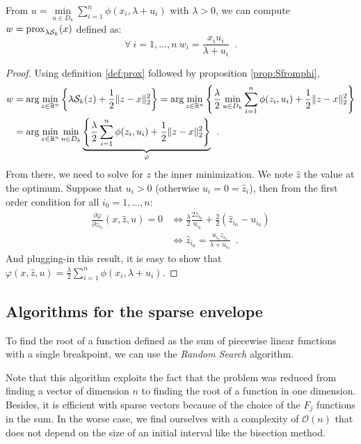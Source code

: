 \begin{proposition}
From $u=\min\limits_{u\in D_k}\sum_{i=1}^n \phi(x_i,\lambda + u_i)$ with $\lambda > 0$, we can compute $w=\operatorname{prox}_{\lambda\mathcal{S}_k}(x)$ defined as:
\begin{equation}\label{eq:proxui}
    \forall\ i=1,\dots,n\ w_i=\frac{x_iu_i}{\lambda + u_i}\enspace.
\end{equation}
\end{proposition}
\begin{proof}
Using definition \ref{def:prox} followed by proposition \ref{prop:Sfromphi}, \[\begin{aligned}
w&=\arg\min_{z\in\mathbb{R}^n}\left\{\lambda\mathcal{S}_k(z) + \frac{1}{2}\|z-x\|^2_2\right\} = \arg\min_{z\in\mathbb{R}^n}\left\{\frac{\lambda}{2}\min_{u\in D_k}\sum_{i=1}^n\phi(z_i, u_i) + \frac{1}{2}\|z-x\|^2_2\right\}\\
&=\arg\min_{z\in\mathbb{R}^n}\min_{u\in D_k}\underbrace{\left\{\frac{\lambda}{2}\sum_{i=1}^n\phi(z_i, u_i) + \frac{1}{2}\|z-x\|^2_2\right\}}_{\varphi}\enspace.
\end{aligned}\]
From there, we need to solve for $z$ the inner minimization. We note $\hat z$ the value at the optimum. Suppose that $u_i>0$ (otherwise $u_i=0=\hat z_i$), then from the first order condition for all $i_0=1,\dots,n$:
\[\begin{aligned}
\frac{\partial\varphi}{\partial z_{i_0}}(x, \hat z, u)= 0 &\Longleftrightarrow \frac{\lambda}{2}\frac{2\hat z_{i_0}}{u_{i_0}} + \frac{2}{2}(\hat z_{i_0} - u_{i_0})\\
& \Longleftrightarrow \hat z_{i_0} = \frac{u_{i_0}z_{i_0}}{\lambda + u_{i_0}}\enspace.
\end{aligned}\]
And plugging-in this result, it is easy to show that $\varphi(x,\hat z, u) = \frac{\lambda}{2}\sum_{i=1}^n \phi(x_i, \lambda + u_i)$.
\end{proof}

\subsection[Algorithm]{Algorithms for the sparse envelope}
To find the root of a function defined as the sum of piecewise linear functions with a single breakpoint, we can use the \textit{Random Search} algorithm.


\begin{remark}
Note that this algorithm exploits the fact that the problem was reduced from finding a vector of dimension $n$ to finding the root of a function in one dimension. Besides, it is efficient with sparse vectors because of the choice of the $F_j$ functions in the sum. In the worse case, we find ourselves with a complexity of $\mathcal{O}(n)$ that does not depend on the size of an initial interval like the bisection method.
\end{remark}

